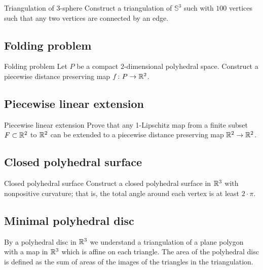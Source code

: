 \begin{pr}{}{Triangulation of 3-sphere}\label{4-poly}
Construct a triangulation of $\mathbb{S}^3$ 
such with $100$ vertices
such that any two vertices are connected by an edge.
\end{pr}

\subsection*{Folding problem}

\begin{pr}{}{Folding problem} \label{Folding problem}
Let $P$ be a compact $2$-dimensional 
polyhedral space. 
Construct a 
piecewise distance preserving map
$f\colon P\to \mathbb{R}^2$.
\end{pr}

\subsection*{Piecewise linear extension}

\begin{pr}{}{Piecewise linear extension} \label{iso-kirzhbraun}
Prove that any 1-Lipschitz map from a finite subset $F\subset \mathbb{R}^2$
to 
$\mathbb{R}^2$ can be extended to a 
piecewise distance preserving map
$\mathbb{R}^2\to\mathbb{R}^2$.
\end{pr}

\subsection*{Closed polyhedral surface}

\begin{pr}{}{Closed polyhedral surface}\label{Closed polyhedral surface}
Construct a closed polyhedral surface in $\mathbb{R}^3$ with nonpositive curvature;
that is, the total angle around each vertex is at least $2\cdot\pi$.
\end{pr}

\subsection*{Minimal polyhedral disc}

By a polyhedral disc in $\mathbb{R}^3$
we understand a triangulation of a plane polygon with a map in $\mathbb{R}^3$ which is affine on each triangle.
The area of the polyhedral disc is defined as the sum of areas of the images of the triangles in the triangulation.

